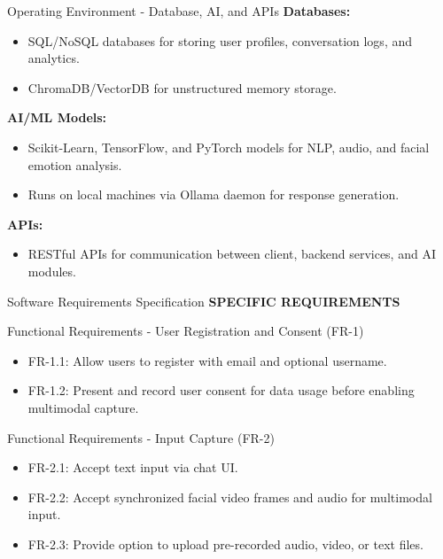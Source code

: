 \documentclass[11pt]{beamer}
\begin{document}
\begin{frame}{Operating Environment - Database, AI, and APIs}
\textbf{Databases:}
\begin{itemize}
    \item SQL/NoSQL databases for storing user profiles, conversation logs, and analytics.
    \item ChromaDB/VectorDB for unstructured memory storage.
\end{itemize}

\textbf{AI/ML Models:}
\begin{itemize}
    \item Scikit-Learn, TensorFlow, and PyTorch models for NLP, audio, and facial emotion analysis.
    \item Runs on local machines via Ollama daemon for response generation.
\end{itemize}

\textbf{APIs:}
\begin{itemize}
    \item RESTful APIs for communication between client, backend services, and AI modules.
\end{itemize}
\end{frame}



\begin{frame}{Software Requirements Specification}
    \justifying
    \centering
    \huge \textbf{SPECIFIC REQUIREMENTS}
\end{frame}

\begin{frame}{Functional Requirements - User Registration and Consent (FR-1)}
\begin{itemize}
    \item FR-1.1: Allow users to register with email and optional username.
    \item FR-1.2: Present and record user consent for data usage before enabling multimodal capture.
\end{itemize}
\end{frame}

\begin{frame}{Functional Requirements - Input Capture (FR-2)}
\begin{itemize}
    \item FR-2.1: Accept text input via chat UI.
    \item FR-2.2: Accept synchronized facial video frames and audio for multimodal input.
    \item FR-2.3: Provide option to upload pre-recorded audio, video, or text files.
\end{itemize}
\end{frame}
\end{document}
